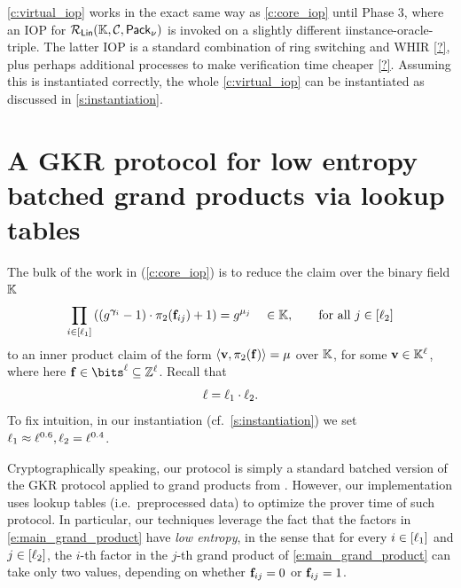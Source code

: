 \documentclass[11pt,letterpaper,usenames,dvipsnames]{article}
\begin{document}
\begin{remark}
    \cref{c:virtual_iop} works in the exact same way as \cref{c:core_iop} until Phase 3, where an IOP for $\LIN(\comfield,\cC, \pack)$ is invoked on a slightly different iinstance-oracle-triple. The latter IOP is a standard combination of ring switching and WHIR \cref{?}, plus perhaps additional processes to make verification time cheaper \cref{?}. Assuming this is instantiated correctly, the whole \cref{c:virtual_iop} can be instantiated as discussed in \cref{s:instantiation}.  
\end{remark}



\section{A GKR protocol for low entropy batched grand products via lookup tables}\label{s:gkr_low_entropy}





The bulk of the work in \ftwoz (\cref{c:core_iop}) is to reduce the claim over the binary field $\comfield$
\begin{equation}\label{e:main_grand_product}
\prod_{i \in [\codedim_1]} \left(\left(g^{\bm{\gamma}_i}-1\right)\cdot \pi_2(\bff_{ij}) +1\right)= g^{\mu_j}  \quad  \in \comfield, \qquad \text{for all } j\in [\codedim_2]
\end{equation}
to an inner product claim  of the form $\langle \mathbf{v}, \pi_2(\mathbf{f})\rangle =\mu$ over $\comfield$, for some $\vv\in \comfield^{\codedim}$, where here $\bff\in \bits^\codedim \subseteq \ZZ^\codedim$.  Recall that $$\ell=\ell_1\cdot \ell_2.$$ To fix intuition,  in our instantiation (cf.\ \cref{s:instantiation}) we set $\ell_1 \approx \ell^{0.6}, \ell_2=\ell^{0.4}$. %


\renewcommand{\comfield}{\KK}


Cryptographically speaking, our protocol is simply a standard batched version of the GKR protocol applied to grand products from \cite{?}. However, our implementation uses lookup tables (i.e.\ preprocessed data) to optimize the prover time of such protocol. In particular, our techniques leverage the fact that the factors in \eqref{e:main_grand_product} have \emph{low entropy}, in the sense that for every $i\in [\ell_1]$ and $j\in [\ell_2]$, the $i$-th factor in the $j$-th grand product of \eqref{e:main_grand_product} can take only two values, depending on whether $\mathbf{f}_{ij}=0$ or $\mathbf{f}_{ij}=1$.  
\end{document}
